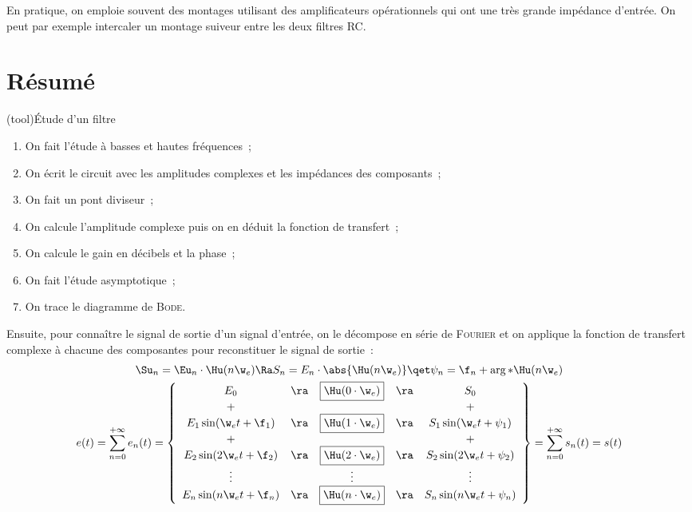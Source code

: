 \documentclass[../../main/main.tex]{subfiles}
\begin{document}
En pratique, on emploie souvent des montages utilisant des amplificateurs
opérationnels qui ont une très grande impédance d'entrée. On peut par exemple
intercaler un montage suiveur entre les deux filtres RC.

\section{Résumé}
\begin{tcb*}[breakable](tool){Étude d'un filtre}
	\begin{enumerate}
		\item On fait l'étude à basses et hautes fréquences~;
		\item On écrit le circuit avec les amplitudes complexes et les impédances des
		      composants~;
		\item On fait un pont diviseur~;
		\item On calcule l'amplitude complexe puis on en déduit la fonction de
		      transfert~;
		\item On calcule le gain en décibels et la phase~;
		\item On fait l'étude asymptotique~;
		\item On trace le diagramme de \textsc{Bode}.
	\end{enumerate}
	Ensuite, pour connaître le signal de sortie d'un signal d'entrée, on le
	décompose en série de \textsc{Fourier} et on applique la fonction de transfert
	complexe à chacune des composantes pour reconstituer le signal de sortie~:
	\begin{gather*}
		\Su_n = \Eu_n \cdot \Hu(n\w_e) \Ra
		S_n = E_n \cdot \abs{\Hu(n\w_e)}
		\qet
		\psi_n = \f_n + \arg*{\Hu(n\w_e)}
		\\
		e(t) = \sum_{n=0}^{+\infty} e_n(t) =
		\left\{
		\begin{array}{ccccc}
			E_0                     & \ra & \fbox{$\Hu(0\cdot\w_e)$} & \ra & S_0
			\\
			+                       &     &                          &     & +
			\\
			E_1\sin(\w_e t + \f_1)  & \ra & \fbox{$\Hu(1\cdot\w_e)$} & \ra & S_1\sin(\w_e t + \psi_1)
			\\
			+                       &     &                          &     & +
			\\
			E_2\sin(2\w_e t + \f_2) & \ra & \fbox{$\Hu(2\cdot\w_e)$} & \ra & S_2\sin(2\w_e t + \psi_2)
			\\
			\vdots                  &     & \vdots                   &     & \vdots
			\\
			E_n\sin(n\w_e t + \f_n) & \ra & \fbox{$\Hu(n\cdot\w_e)$} & \ra & S_n\sin(n\w_e t + \psi_n)
		\end{array}
		\right\}
		= \sum_{n=0}^{+\infty}s_n(t)
		= s(t)
	\end{gather*}
\end{tcb*}

\vspace*{-15pt}
\end{document}
